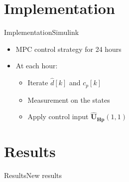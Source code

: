 \section{Implementation}

\begin{frame}{Implementation}{Simulink}
\begin{itemize}
\item<1-> MPC control strategy for 24 hours
\item<1-> At each hour:
	 	\begin{itemize}
	 	\item<1-> Iterate $\hat{d}[k]$ and $c_p [k]$
	 	\item<1-> Measurement on the states 
	 	\item<1-> Apply control input $\pmb{\hat{U}_{Hp}}(1,1)$
	 	\end{itemize}
\end{itemize}

\begin{figure}[H]
\centering
 
\end{figure}

\end{frame}




\section{Results}

\begin{frame}{Results}{New results}

\begin{figure}[H]
   \centering
    
\end{figure}

\end{frame}


